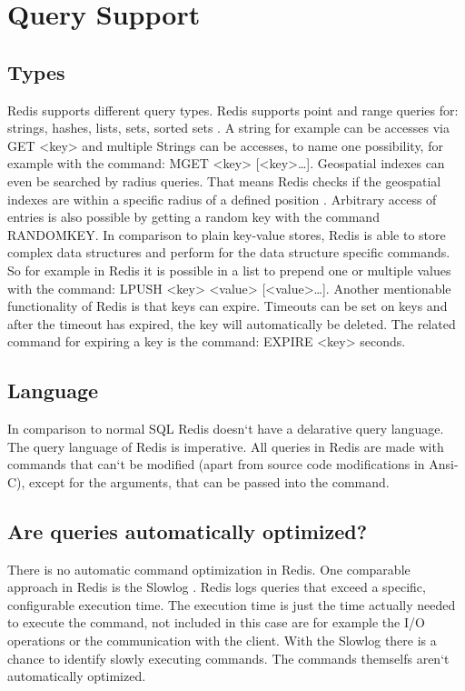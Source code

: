 \chapter{Query Support}

\section{Types}
Redis supports different query types. Redis supports point and range queries for:
strings, hashes, lists, sets, sorted sets \cite{redis_introduction}. A string for example can be accesses via GET <key> and multiple Strings can be accesses, to name one possibility, for example with the command: MGET <key> [<key>…]. Geospatial indexes can even be searched by radius queries. That means Redis checks if the geospatial indexes are within a specific radius of a defined position \cite{redis_commands}. Arbitrary access of entries is also possible by getting a random key with the command RANDOMKEY. In comparison to plain key-value stores, Redis is able to store complex data structures and perform for the data structure specific commands. So for example in Redis it is possible in a list to prepend one or multiple values with the command: LPUSH <key> <value> [<value>…]. Another mentionable functionality of Redis is that keys can expire. Timeouts can be set on keys and after the timeout has expired, the key will automatically be deleted. The related command for expiring a key is the command: EXPIRE <key> {seconds}.

\section{Language}
In comparison to normal SQL Redis doesn‘t have a delarative query language. The query language of Redis is imperative. All queries in Redis are made with commands that can‘t be modified (apart from source code modifications in Ansi-C), except for the arguments, that can be passed into the command.

\section{Are queries automatically optimized?}
There is no automatic command optimization in Redis. One comparable approach in Redis is the Slowlog \cite{redis_slowlog}. Redis logs queries that exceed a specific, configurable execution time. The execution time is just the time actually needed to execute the command, not included in this case are for example the I/O operations or the communication with the client. With the Slowlog there is a chance to identify slowly executing commands. The commands themselfs aren‘t automatically optimized.
